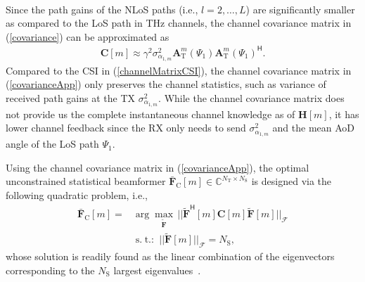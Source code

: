 \documentclass[journal,10pt]{IEEEtran}
\DeclareMathOperator*{\maximize}{max} %
\DeclareMathOperator*{\subjectto}{s.\hspace{3pt} t.:\hspace{3pt}} %
\begin{document}
{\begin{align}
		\end{align}
		Since the path gains of the NLoS paths (i.e., $l = 2,\dots, L$) are significantly smaller as compared to the LoS path in THz channels, the channel covariance matrix in (\ref{covariance}) can be approximated as
		\begin{align}
		\label{covarianceApp}
		\mathbf{C}[m] \approx \gamma^2 \sigma_{\alpha_{1,m}}^2 \mathbf{A}_\mathrm{T}^m(\Psi_{1})\mathbf{A}_\mathrm{T}^m(\Psi_{1})^\textsf{H}.
		\end{align}
		Compared to the CSI in (\ref{channelMatrixCSI}), the channel covariance matrix in  (\ref{covarianceApp}) only preserves the channel statistics, such as variance of received path gains at the TX $\sigma_{\alpha_{1,m}}^2$.	While the channel covariance matrix does not provide us the complete instantaneous channel knowledge as of $\mathbf{H}[m]$, it has lower channel feedback since the RX only needs to send $\sigma_{\alpha_{1,m}}^2$  and the mean AoD angle of the LoS path $\Psi_{1}$.
		
		Using the channel covariance matrix in (\ref{covarianceApp}), the optimal unconstrained statistical beamformer  $\bar{\mathbf{F}}_\mathrm{C}[m]\in \mathbb{C}^{N_\mathrm{T}\times N_\mathrm{S}}$ is designed via the following quadratic problem, i.e.,
		\begin{align}
		\label{FoptStat}
		\bar{\mathbf{F}}_\mathrm{C}[m] = &\arg \maximize_{\tilde{\mathbf{F}}} \hspace{2pt} ||\tilde{\mathbf{F}}^\textsf{H} [m]\mathbf{C}[m] \tilde{\mathbf{F}}[m]||_\mathcal{F} \nonumber \\
		&\subjectto || \tilde{\mathbf{F}}[m] ||_\mathcal{F} = N_\mathrm{S},
		\end{align}
		whose solution is readily found as the linear combination of the eigenvectors corresponding to the $N_\mathrm{S}$ largest eigenvalues~\cite{statisticalChannelModel1}.
		
		
		
}
\end{document}
